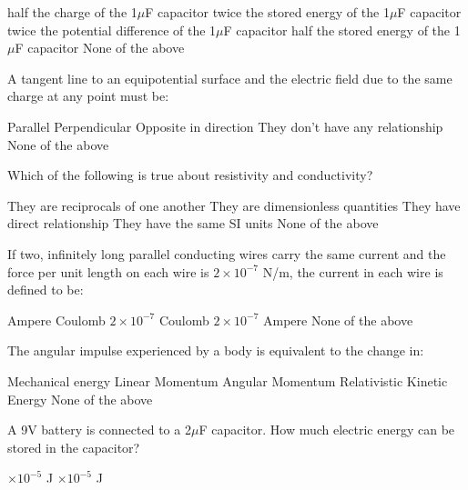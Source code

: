 \documentclass[12pt,addpoints]{exam}
\begin{document}
{{{\begin{questions}
					\begin{oneparchoices}
						\choice half the charge of the 1$\mu$F capacitor
						\choice twice the stored energy of the 1$\mu$F capacitor
						\choice twice the potential difference of the 1$\mu$F capacitor
						\choice half the stored energy of the 1$\mu$F capacitor
						\choice None of the above
					\end{oneparchoices}
					\question A tangent line to an equipotential surface and the electric field due to the same charge at any point must be:\\
					\begin{oneparchoices}
						\choice Parallel
						\choice Perpendicular
						\choice Opposite in direction
						\choice They don't have any relationship
						\choice None of the above
					\end{oneparchoices}
					\question Which of the following is true about resistivity and conductivity?\\
					\begin{oneparchoices}
						\choice They are reciprocals of one another
						\choice They are dimensionless quantities
						\choice They have direct relationship
						\choice They have the same SI units
						\choice None of the above
					\end{oneparchoices}
					\question If two, infinitely long parallel conducting wires carry the same current and the force per unit length on each wire is $2\times10^{-7}$ N/m, the current in each wire is defined to be:\\
					\begin{oneparchoices}
						\choice 1 Ampere
						\choice 1 Coulomb
						\choice $2\times10^{-7}$ Coulomb
						\choice $2\times10^{-7}$ Ampere
						\choice None of the above
					\end{oneparchoices}
					\question The angular impulse experienced by a body is equivalent to the change in:\\
					\begin{oneparchoices}
						\choice Mechanical energy
						\choice Linear Momentum
						\choice Angular Momentum
						\choice Relativistic Kinetic Energy
						\choice None of the above
					\end{oneparchoices}
					\question A 9V battery is connected to a 2$\mu$F capacitor. How much electric energy can be stored in the capacitor?\\
					\begin{oneparchoices}
						$\times10^{-5}$ J
						$\times10^{-5}$ J

\end{oneparchoices}
\end{questions}}}}
\end{document}
